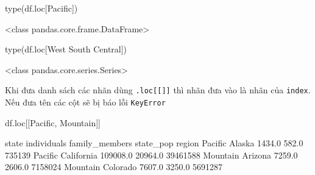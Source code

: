 \documentclass[
]{book}
\newenvironment{Shaded}{\begin{snugshade}}{\end{snugshade}}
\newcommand{\BuiltInTok}[1]{#1}
\newcommand{\NormalTok}[1]{#1}
\newcommand{\StringTok}[1]{\textcolor[rgb]{0.31,0.60,0.02}{#1}}
\begin{document}
\begin{Shaded}
\begin{Highlighting}[]
\BuiltInTok{type}\NormalTok{(df.loc[}\StringTok{\textquotesingle{}Pacific\textquotesingle{}}\NormalTok{])}
\end{Highlighting}
\end{Shaded}

\begin{Shaded}
\begin{Highlighting}[]
\NormalTok{\textless{}class \textquotesingle{}pandas.core.frame.DataFrame\textquotesingle{}\textgreater{}}
\end{Highlighting}
\end{Shaded}

\begin{Shaded}
\begin{Highlighting}[]
\BuiltInTok{type}\NormalTok{(df.loc[}\StringTok{\textquotesingle{}West South Central\textquotesingle{}}\NormalTok{])}
\end{Highlighting}
\end{Shaded}

\begin{Shaded}
\begin{Highlighting}[]
\NormalTok{\textless{}class \textquotesingle{}pandas.core.series.Series\textquotesingle{}\textgreater{}}
\end{Highlighting}
\end{Shaded}

Khi đưa danh sách các nhãn dùng \texttt{.loc{[}{[}{]}{]}} thì nhãn đưa vào là nhãn của \texttt{index}. Nếu đưa tên các cột sẽ bị báo lỗi \texttt{KeyError}

\begin{Shaded}
\begin{Highlighting}[]
\NormalTok{df.loc[[}\StringTok{\textquotesingle{}Pacific\textquotesingle{}}\NormalTok{, }\StringTok{\textquotesingle{}Mountain\textquotesingle{}}\NormalTok{]]}
\end{Highlighting}
\end{Shaded}

\begin{Shaded}
\begin{Highlighting}[]
\NormalTok{               state  individuals  family\_members  state\_pop}
\NormalTok{region                                                      }
\NormalTok{Pacific       Alaska       1434.0           582.0     735139}
\NormalTok{Pacific   California     109008.0         20964.0   39461588}
\NormalTok{Mountain     Arizona       7259.0          2606.0    7158024}
\NormalTok{Mountain    Colorado       7607.0          3250.0    5691287}
\end{Highlighting}
\end{Shaded}
\end{document}
